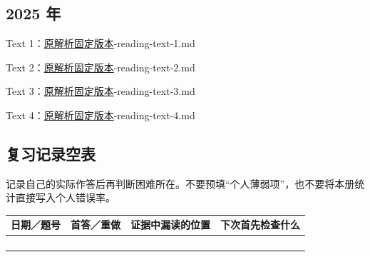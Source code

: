 \documentclass[11pt,a4paper]{article}
\begin{document}
\subsection*{2025 年}
\noindent Text 1：\href{https://zj139.github.io/math-notes/english/cabb22521ad878901633c3a3/}{原解析}\quad \href{https://github.com/ZJ139/math-notes/blob/5b6ada93f63a25980b3b97ee80a363ebe752b91a/content/english/reading-answers/2025-reading-text-1.md}{固定版本}-reading-text-1.md\par\smallskip
\noindent Text 2：\href{https://zj139.github.io/math-notes/english/b852b5bb77b21d41f0543171/}{原解析}\quad \href{https://github.com/ZJ139/math-notes/blob/5b6ada93f63a25980b3b97ee80a363ebe752b91a/content/english/reading-answers/2025-reading-text-2.md}{固定版本}-reading-text-2.md\par\smallskip
\noindent Text 3：\href{https://zj139.github.io/math-notes/english/c07bae9858bf4768714b07ae/}{原解析}\quad \href{https://github.com/ZJ139/math-notes/blob/5b6ada93f63a25980b3b97ee80a363ebe752b91a/content/english/reading-answers/2025-reading-text-3.md}{固定版本}-reading-text-3.md\par\smallskip
\noindent Text 4：\href{https://zj139.github.io/math-notes/english/2d3b4c55b3c8d254540a4e16/}{原解析}\quad \href{https://github.com/ZJ139/math-notes/blob/5b6ada93f63a25980b3b97ee80a363ebe752b91a/content/english/reading-answers/2025-reading-text-4.md}{固定版本}-reading-text-4.md\par\smallskip
\subsection*{复习记录空表}
记录自己的实际作答后再判断困难所在。不要预填“个人薄弱项”，也不要将本册统计直接写入个人错误率。

\noindent\begin{tabular}{@{}p{2.1cm}p{3.3cm}p{3.5cm}p{5.7cm}@{}}\toprule 日期／题号 & 首答／重做 & 证据中漏读的位置 & 下次首先检查什么\\\midrule
\rule{0pt}{24pt} & & &\\\midrule
\rule{0pt}{24pt} & & &\\\midrule
\rule{0pt}{24pt} & & &\\\midrule
\rule{0pt}{24pt} & & &\\\midrule
\end{tabular}
\end{document}
